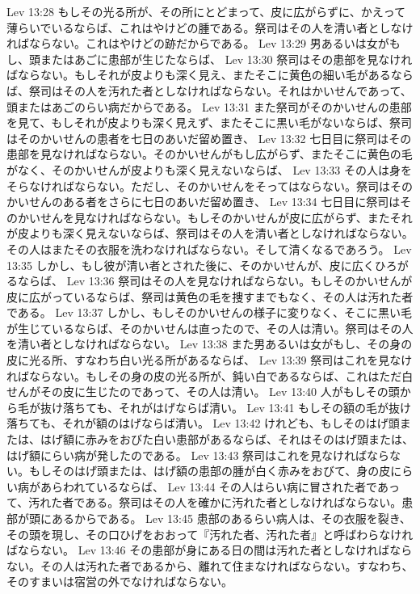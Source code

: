 Lev 13:28  もしその光る所が、その所にとどまって、皮に広がらずに、かえって薄らいでいるならば、これはやけどの腫である。祭司はその人を清い者としなければならない。これはやけどの跡だからである。
Lev 13:29  男あるいは女がもし、頭またはあごに患部が生じたならば、
Lev 13:30  祭司はその患部を見なければならない。もしそれが皮よりも深く見え、またそこに黄色の細い毛があるならば、祭司はその人を汚れた者としなければならない。それはかいせんであって、頭またはあごのらい病だからである。
Lev 13:31  また祭司がそのかいせんの患部を見て、もしそれが皮よりも深く見えず、またそこに黒い毛がないならば、祭司はそのかいせんの患者を七日のあいだ留め置き、
Lev 13:32  七日目に祭司はその患部を見なければならない。そのかいせんがもし広がらず、またそこに黄色の毛がなく、そのかいせんが皮よりも深く見えないならば、
Lev 13:33  その人は身をそらなければならない。ただし、そのかいせんをそってはならない。祭司はそのかいせんのある者をさらに七日のあいだ留め置き、
Lev 13:34  七日目に祭司はそのかいせんを見なければならない。もしそのかいせんが皮に広がらず、またそれが皮よりも深く見えないならば、祭司はその人を清い者としなければならない。その人はまたその衣服を洗わなければならない。そして清くなるであろう。
Lev 13:35  しかし、もし彼が清い者とされた後に、そのかいせんが、皮に広くひろがるならば、
Lev 13:36  祭司はその人を見なければならない。もしそのかいせんが皮に広がっているならば、祭司は黄色の毛を捜すまでもなく、その人は汚れた者である。
Lev 13:37  しかし、もしそのかいせんの様子に変りなく、そこに黒い毛が生じているならば、そのかいせんは直ったので、その人は清い。祭司はその人を清い者としなければならない。
Lev 13:38  また男あるいは女がもし、その身の皮に光る所、すなわち白い光る所があるならば、
Lev 13:39  祭司はこれを見なければならない。もしその身の皮の光る所が、鈍い白であるならば、これはただ白せんがその皮に生じたのであって、その人は清い。
Lev 13:40  人がもしその頭から毛が抜け落ちても、それがはげならば清い。
Lev 13:41  もしその額の毛が抜け落ちても、それが額のはげならば清い。
Lev 13:42  けれども、もしそのはげ頭または、はげ額に赤みをおびた白い患部があるならば、それはそのはげ頭または、はげ額にらい病が発したのである。
Lev 13:43  祭司はこれを見なければならない。もしそのはげ頭または、はげ額の患部の腫が白く赤みをおびて、身の皮にらい病があらわれているならば、
Lev 13:44  その人はらい病に冒された者であって、汚れた者である。祭司はその人を確かに汚れた者としなければならない。患部が頭にあるからである。
Lev 13:45  患部のあるらい病人は、その衣服を裂き、その頭を現し、その口ひげをおおって『汚れた者、汚れた者』と呼ばわらなければならない。
Lev 13:46  その患部が身にある日の間は汚れた者としなければならない。その人は汚れた者であるから、離れて住まなければならない。すなわち、そのすまいは宿営の外でなければならない。
